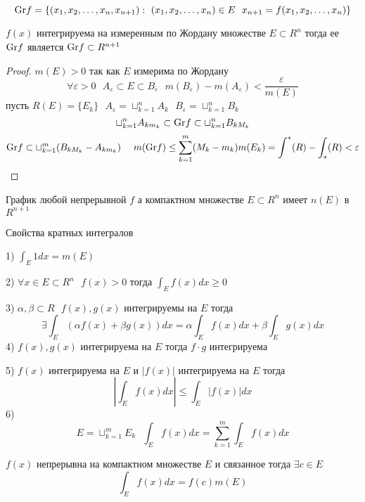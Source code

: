 \begin{define}
  $$
  \mathrm{Gr} f = \{ (x_1, x_2, \ldots, x_n, x_{n+1}): ~ (x_1, x_2, \ldots, x_n) \in E
  ~~ x_{n+1} = f(x_1, x_2, \ldots, x_n) \}
  $$
\end{define}

\begin{theorem}
  $f(x)$ интегрируема на измеренным по Жордану множестве $E \subset R^n$ тогда
  ее $\mathrm{Gr} f$ является $\mathrm{Gr} f \subset R^{n+1}$
\end{theorem}

\begin{proof}
  $m(E) > 0$ так как $E$ измерима по Жордану
  $$
  \forall \varepsilon > 0 ~~~ A_{\varepsilon} \subset E \subset B_{\varepsilon}
  ~~~ m(B_{\varepsilon}) - m(A_{\varepsilon}) < \frac{\varepsilon}{m(E)}
  $$
  пусть $R(E) = \{E_k\} ~~~ A_{\varepsilon} = \sqcup_{k=1}^n A_k ~~~
  B_{\varepsilon} = \sqcup_{k=1}^n B_k$
  $$
  \sqcup_{k=1}^n A_{k m_k} \subset \mathrm{Gr} f \subset \sqcup_{k=1}^n B_{k M_k}
  $$
  $$
  \mathrm{Gr} f \subset \sqcup_{k=1}^m (B_{k M_k} - A_{k m_k}) ~~~~
  m(\mathrm{Gr} f) \le \sum_{k=1}^m (M_k - m_k)m(E_k) =
  \int^* (R) - \int_* (R) < \varepsilon
  $$
\end{proof}

\begin{block}[Следствие]
  График любой непрерывной $f$ а компактном множестве $E \subset R^n$ имеет
  $n(E)$ в $R^{n+1}$
\end{block}

\begin{title}[\Large]
  Свойства кратных интегралов
\end{title}

\begin{block}[Свойства]
  1) $\int_E 1 dx = m(E)$

  2) $\forall x \in E \subset R^n ~~~ f(x) > 0$ тогда $\int_E f(x) dx \ge 0$

  3) $\alpha, \beta \subset R ~~~ f(x), g(x)$ интегрируемы на $E$ тогда
  $$
  \exists \int_E (\alpha f(x) + \beta g(x)) dx = \alpha \int_E f(x)dx +
  \beta \int_E g(x) dx
  $$
  4) $f(x), g(x)$ интегрируема на $E$ тогда $f \cdot g$ интегрируема

  5) $f(x)$ интегрируема на $E$ и $|f(x)|$ интегрируема на $E$ тогда
  $$
  \left| \int_E f(x) dx \right| \le \int_E |f(x)|dx
  $$
  6)
  $$
  E = \sqcup_{k=1}^m E_k ~~~ \int_E f(x) dx = \sum_{k=1}^m \int_E f(x) dx
  $$
\end{block}

\begin{theorem}[о среднем]
  $f(x)$ непрерывна на компактном множестве $E$ и связанное тогда
  $\exists c \in E$
  $$
  \int_E f(x)dx = f(c) m(E)
  $$
\end{theorem}

